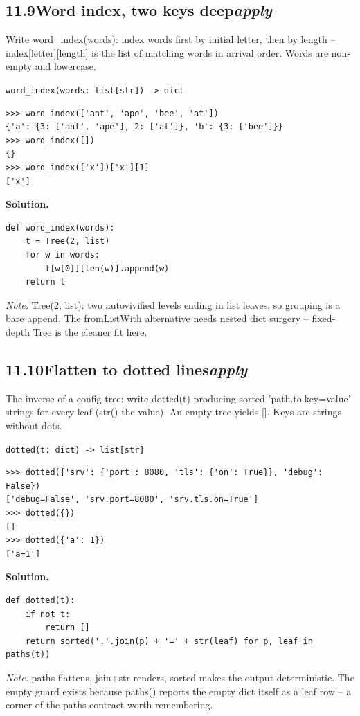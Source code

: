 \documentclass[10pt,letterpaper]{book}
\begin{document}
\subsection*{11.9\quad Word index, two keys deep\hfill\textnormal{\textit{apply}}}
Write word\_index(words): index words first by initial letter, then by length -- index[letter][length] is the list of matching words in arrival order. Words are non-empty and lowercase.

\noindent\texttt{word\_index(words: list[str]) -> dict}
\begin{lstlisting}[style=ex]
>>> word_index(['ant', 'ape', 'bee', 'at'])
{'a': {3: ['ant', 'ape'], 2: ['at']}, 'b': {3: ['bee']}}
>>> word_index([])
{}
>>> word_index(['x'])['x'][1]
['x']
\end{lstlisting}
\noindent\textbf{Solution.}
\begin{lstlisting}[style=code]
def word_index(words):
    t = Tree(2, list)
    for w in words:
        t[w[0]][len(w)].append(w)
    return t
\end{lstlisting}
\noindent\textit{Note.} Tree(2, list): two autovivified levels ending in list leaves, so grouping is a bare append. The fromListWith alternative needs nested dict surgery -- fixed-depth Tree is the cleaner fit here.

\subsection*{11.10\quad Flatten to dotted lines\hfill\textnormal{\textit{apply}}}
The inverse of a config tree: write dotted(t) producing sorted 'path.to.key=value' strings for every leaf (str() the value). An empty tree yields []. Keys are strings without dots.

\noindent\texttt{dotted(t: dict) -> list[str]}
\begin{lstlisting}[style=ex]
>>> dotted({'srv': {'port': 8080, 'tls': {'on': True}}, 'debug': False})
['debug=False', 'srv.port=8080', 'srv.tls.on=True']
>>> dotted({})
[]
>>> dotted({'a': 1})
['a=1']
\end{lstlisting}
\noindent\textbf{Solution.}
\begin{lstlisting}[style=code]
def dotted(t):
    if not t:
        return []
    return sorted('.'.join(p) + '=' + str(leaf) for p, leaf in paths(t))
\end{lstlisting}
\noindent\textit{Note.} paths flattens, join+str renders, sorted makes the output deterministic. The empty guard exists because paths({}) reports the empty dict itself as a leaf row -- a corner of the paths contract worth remembering.
\end{document}
